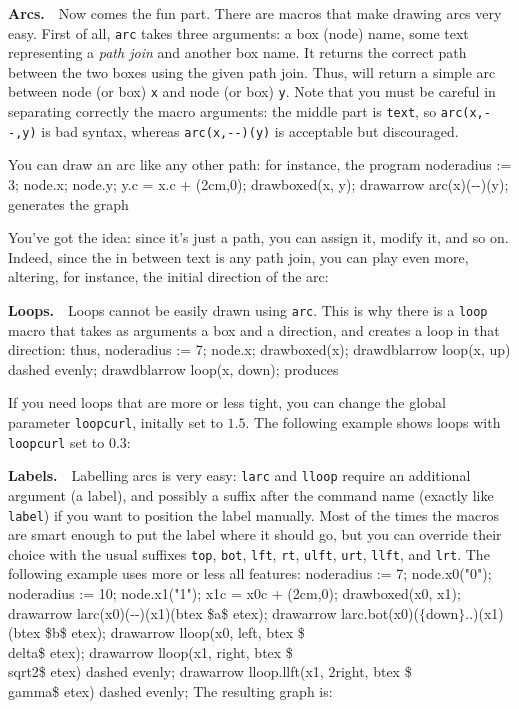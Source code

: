 {\bf Arcs.}~~Now comes the fun part. There are macros that make drawing arcs very easy. First of all, {\tt arc} takes three arguments: a box (node) name, some text representing a {\it path join\/} and another box name. It returns the
correct path between the two boxes using the given path join. Thus,
 will return a simple arc between node (or box) {\tt x} and node (or box) {\tt y}. 
Note that you
must be careful in separating correctly the macro arguments: the middle part is {\tt text}, so
{\tt arc(x,-{}-,y)} is bad syntax, whereas {\tt arc(x,-{}-)(y)} is acceptable but discouraged. 

You can draw an arc like any other path: for instance, the program
\begincode
noderadius := 3;
node.x; node.y;
y.c = x.c + (2cm,0);
drawboxed(x, y);
drawarrow arc(x)(-{}-)(y);
\endcode
generates the graph

You've got the idea: since it's just a path, you can assign it, modify it, and so on.
Indeed, since the in between text is any path join, you can play even more, altering, for instance, the initial 
direction of the arc:

{\bf Loops.}~~Loops cannot be easily drawn using {\tt arc}. This is why there is a {\tt loop} macro that takes as arguments
a box and a direction, and creates a loop in that direction: thus,
\begincode
	noderadius := 7;
	node.x;
	drawboxed(x);
	drawdblarrow loop(x, up) dashed evenly;
	drawdblarrow loop(x, down);
\endcode
produces


If you need loops that are more or less tight, you can change the global parameter {\tt loopcurl}, initally
set to $1.5$. The following example shows loops with {\tt loopcurl} set to $0.3$:


{\bf Labels.}~~Labelling arcs is very easy: {\tt larc} and {\tt lloop} require an additional argument (a label),
and possibly a suffix after the command name (exactly like {\tt label}) if you want to position the label manually.
Most of the times the macros are smart enough to put the label where it should go, but you can override
their choice with the usual suffixes {\tt top}, {\tt bot}, {\tt lft}, {\tt rt},
{\tt ulft}, {\tt urt}, {\tt llft}, and {\tt lrt}. The following example uses
more or less all features:
\begincode
	noderadius := 7; node.x0("0"); 
	noderadius := 10; node.x1("1");
	x1c = x0c + (2cm,0);
	drawboxed(x0, x1);
	drawarrow larc(x0)(-{}-)(x1)(btex \$a\$ etex);
	drawarrow larc.bot(x0)($\{$down$\}$..)(x1)(btex \$b\$ etex);
	drawarrow lloop(x0, left, btex \$\\delta\$ etex);
	drawarrow lloop(x1, right, btex \$\\sqrt2\$ etex) dashed evenly;
	drawarrow lloop.llft(x1, 2right, btex \$\\gamma\$ etex) dashed evenly;
\endcode
The resulting graph is:

